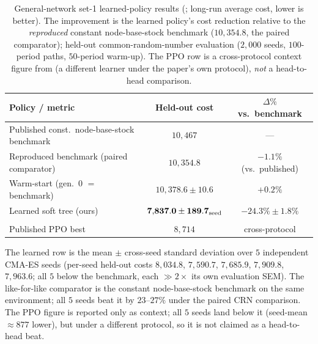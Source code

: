 \documentclass[11pt]{article}
\begin{document}
\begin{table}[!htbp]
\centering
\caption{General-network set-1 learned-policy results (\citealp{geevers2024cardboard}; long-run average
cost, lower is better). The improvement is the learned policy's cost reduction relative to the
\emph{reproduced} constant node-base-stock benchmark ($10{,}354.8$, the paired comparator); held-out
common-random-number evaluation ($2{,}000$ seeds, $100$-period paths, $50$-period warm-up). The PPO row
is a cross-protocol context figure from \citet{geevers2024cardboard} (a different learner under the
paper's own protocol), \emph{not} a head-to-head comparison.}
\label{tab:gbk-results}
\begin{tabular}{lcc}
\toprule
Policy / metric & Held-out cost & $\Delta\%$ vs.\ benchmark \\
\midrule
Published const.\ node-base-stock benchmark & $10{,}467$ & --- \\
Reproduced benchmark (paired comparator) & $10{,}354.8$ & $-1.1\%$ (vs.\ published) \\
Warm-start (gen.\ 0 $=$ benchmark) & $10{,}378.6 \pm 10.6$ & $+0.2\%$ \\
Learned soft tree (ours) & $\mathbf{7{,}837.0 \pm 189.7_{\rm seed}}$ & $\mathbf{-24.3\%\pm1.8\%}$ \\
\addlinespace[2pt]
\multicolumn{3}{l}{\footnotesize Cross-protocol context (not head-to-head):} \\
Published PPO best \citep{geevers2024cardboard} & $8{,}714$ & cross-protocol \\
\bottomrule
\end{tabular}
\par\medskip\footnotesize The learned row is the mean $\pm$ cross-seed standard deviation over $5$
independent CMA-ES seeds (per-seed held-out costs $8{,}034.8$, $7{,}590.7$, $7{,}685.9$, $7{,}909.8$,
$7{,}963.6$; all $5$ below the benchmark, each $\gg 2\times$ its own evaluation SEM). The like-for-like
comparator is the constant node-base-stock benchmark on the same environment; all $5$ seeds beat it by
$23$--$27\%$ under the paired CRN comparison. The PPO figure is reported only as context; all $5$ seeds
land below it (seed-mean $\approx 877$ lower), but under a different protocol, so it is not claimed as a
head-to-head beat.
\end{table}
\FloatBarrier
\end{document}
